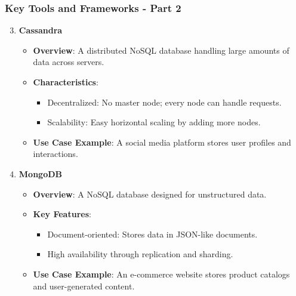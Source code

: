 \documentclass[aspectratio=169]{beamer}
\begin{document}
\begin{frame}[fragile]
    \frametitle{Key Tools and Frameworks - Part 2}
    \begin{enumerate}
        \setcounter{enumi}{2} %
        \item \textbf{Cassandra}
        \begin{itemize}
            \item \textbf{Overview}: A distributed NoSQL database handling large amounts of data across servers.
            \item \textbf{Characteristics}:
            \begin{itemize}
                \item Decentralized: No master node; every node can handle requests.
                \item Scalability: Easy horizontal scaling by adding more nodes.
            \end{itemize}
            \item \textbf{Use Case Example}: A social media platform stores user profiles and interactions.
        \end{itemize}

        \item \textbf{MongoDB}
        \begin{itemize}
            \item \textbf{Overview}: A NoSQL database designed for unstructured data.
            \item \textbf{Key Features}:
            \begin{itemize}
                \item Document-oriented: Stores data in JSON-like documents.
                \item High availability through replication and sharding.
            \end{itemize}
            \item \textbf{Use Case Example}: An e-commerce website stores product catalogs and user-generated content.
        \end{itemize}
    \end{enumerate}
\end{frame}
\end{document}
